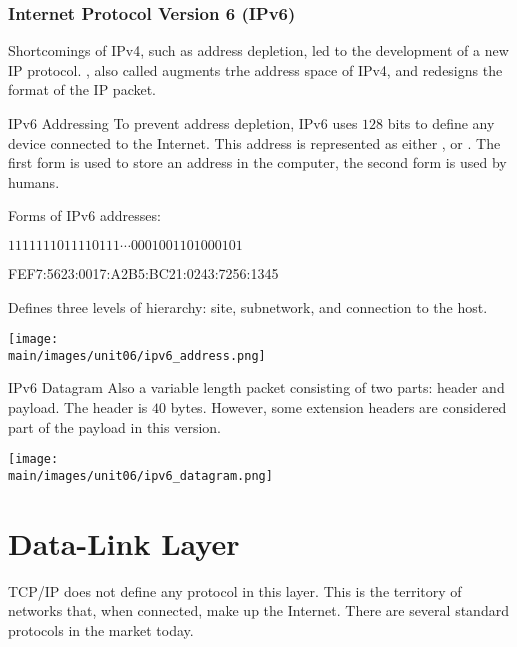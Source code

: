 \documentclass[\main/notes.tex]{subfiles}
\begin{document}
				\subsubsection{Internet Protocol Version 6 (IPv6)}
					Shortcomings of IPv4, such as address depletion, led to the development of a new IP protocol. , also called  augments trhe address space of IPv4, and redesigns the format of the IP packet.
					\begin{definition}{IPv6 Addressing}
						To prevent address depletion, IPv6 uses $128$ bits to define any device connected to the Internet. This address is represented as either , or . The first form is used to store an address in the computer, the second form is used by humans.
						\begin{example}
							Forms of IPv6 addresses:
							\begin{indentparagraph}
								\begin{description}[nosep]
									\item[Binary] $1111111011110111 \cdots 0001001101000101$
									\item[Colon-Hexadecimal] FEF7:5623:0017:A2B5:BC21:0243:7256:1345
								\end{description}
							\end{indentparagraph}
						\end{example}
						Defines three levels of hierarchy: site, subnetwork, and connection to the host.
						\begin{center}
							\texttt{[image: \\main/images/unit06/ipv6\_address.png]}
						\end{center}
					\end{definition}
					\begin{definition}{IPv6 Datagram}
						Also a variable length packet consisting of two parts: header and payload. The header is $40$ bytes. However, some extension headers are considered part of the payload in this version.
						\begin{center}
							\texttt{[image: \\main/images/unit06/ipv6\_datagram.png]}
						\end{center}
					\end{definition}

		\section{Data-Link Layer}
			TCP/IP does not define any protocol in this layer. This is the territory of networks that, when connected, make up the Internet. There are several standard protocols in the market today.
\end{document}
